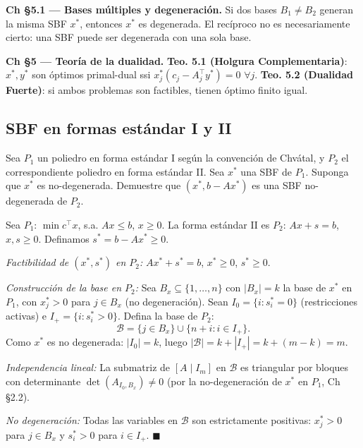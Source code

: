 \documentclass[12pt]{article}
\theoremstyle{plain}
\begin{document}
\begin{teofund}
\textbf{Ch §5.1 — Bases múltiples y degeneración.} Si dos bases $B_1\neq B_2$ generan la misma SBF $x^*$, entonces $x^*$ es degenerada. El recíproco no es necesariamente cierto: una SBF puede ser degenerada con una sola base.

\textbf{Ch §5 — Teoría de la dualidad.} \textbf{Teo. 5.1 (Holgura Complementaria)}: $x^*,y^*$ son óptimos primal-dual ssi $x^*_j(c_j-A_j^\top y^*)=0$ $\forall j$. \textbf{Teo. 5.2 (Dualidad Fuerte)}: si ambos problemas son factibles, tienen óptimo finito igual.
\end{teofund}

\bigskip

\subsection{SBF en formas estándar I y II}

Sea $P_1$ un poliedro en forma estándar I según la convención de Chvátal, y $P_2$ el
correspondiente poliedro en forma estándar II. Sea $x^*$ una SBF de $P_1$. Suponga que
$x^*$ es no-degenerada. Demuestre que $(x^*, b - Ax^*)$ es una SBF no-degenerada de $P_2$.

\begin{solucion}

Sea $P_1$: $\min c^\top x$, s.a. $Ax \leq b$, $x \geq 0$. La forma estándar II es $P_2$: $Ax + s = b$, $x,s \geq 0$. Definamos $s^* = b - Ax^* \geq 0$.

\noindent\textit{Factibilidad de $(x^*,s^*)$ en $P_2$:} $Ax^* + s^* = b$, $x^* \geq 0$, $s^* \geq 0$. \checkmark

\noindent\textit{Construcción de la base en $P_2$:} Sea $B_x \subseteq \{1,\ldots,n\}$ con $|B_x|=k$ la base de $x^*$ en $P_1$, con $x^*_j > 0$ para $j \in B_x$ (no degeneración). Sean $I_0 = \{i : s^*_i = 0\}$ (restricciones activas) e $I_+ = \{i : s^*_i > 0\}$. Defina la base de $P_2$:
\[
\mathcal{B} = \{j \in B_x\} \cup \{n+i : i \in I_+\}.
\]
Como $x^*$ es no degenerada: $|I_0| = k$, luego $|\mathcal{B}| = k + |I_+| = k + (m-k) = m$.

\noindent\textit{Independencia lineal:} La submatriz de $[A\mid I_m]$ en $\mathcal{B}$ es triangular por bloques con determinante $\det(A_{I_0,B_x}) \neq 0$ (por la no-degeneración de $x^*$ en $P_1$, Ch §2.2).

\noindent\textit{No degeneración:} Todas las variables en $\mathcal{B}$ son estrictamente positivas: $x^*_j > 0$ para $j \in B_x$ y $s^*_i > 0$ para $i \in I_+$. $\blacksquare$

\end{solucion}
\end{document}
